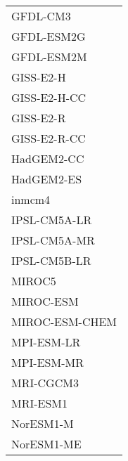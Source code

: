 \documentclass{ametsocV5}
\begin{document}
\begin{table}[t]
\begin{center}
\begin{tabular}{ l }
    GFDL-CM3        \\%
    GFDL-ESM2G      \\%
    GFDL-ESM2M      \\%
    GISS-E2-H       \\%
    GISS-E2-H-CC    \\%
    GISS-E2-R       \\%
    GISS-E2-R-CC    \\%
    HadGEM2-CC      \\%
    HadGEM2-ES      \\%
    inmcm4          \\%
    IPSL-CM5A-LR    \\%
    IPSL-CM5A-MR    \\%
    IPSL-CM5B-LR    \\%
    MIROC5          \\%
    MIROC-ESM       \\%
    MIROC-ESM-CHEM  \\%
    MPI-ESM-LR      \\%
    MPI-ESM-MR      \\%
    MRI-CGCM3       \\%
    MRI-ESM1        \\%
    NorESM1-M       \\%
    NorESM1-ME      \\%

  \end{tabular}
\end{center}
\end{table}
\end{document}
